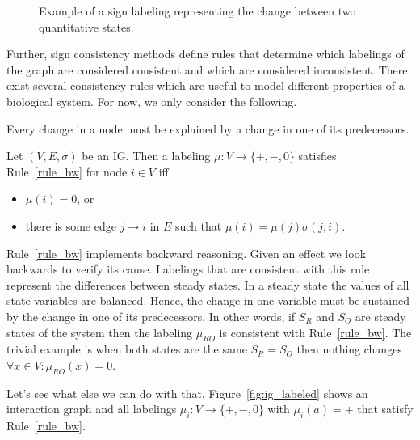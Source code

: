 \begin{figure}
  \caption{Example of a sign labeling representing the change between two quantitative states.
  }
  \label{fig:state_change}
\end{figure}

Further, sign consistency methods define rules that determine which labelings 
of the graph are considered consistent and which are considered inconsistent.
There exist several consistency rules which are useful to model different 
properties of a biological system. 
For now, we only consider the following.

\begin{srule}
\label{rule_bw}
{\upshape Every change in a node must be explained by a change in one of its predecessors.}

Let $(V, E, \sigma)$ be an IG.
Then a labeling $\mu : V \rightarrow \{\plus, \minus, 0\}$ satisfies Rule~\ref{rule_bw} for node $i \in V$ iff
\begin{itemize}
 \item $\mu(i) = 0$, or
 \item there is some edge $j \rightarrow i$ in $E$ 
       such that $\mu(i)=\mu(j)\sigma(j,i)$.
\end{itemize}

 
\end{srule}

Rule~\ref{rule_bw} implements backward reasoning.
Given an effect we look backwards to verify its cause.
Labelings that are consistent with this rule represent the differences between steady states.
In a steady state the values of all state variables are balanced. 
Hence, the change in one variable must be sustained by the change in one of its predecessors.
In other words,
 if $S_R$ and $S_O$ are steady states of the system
 then the labeling $\mu_{RO}$ is consistent with Rule~\ref{rule_bw}.
The trivial example is when both states are the same $S_R = S_O$ then nothing changes $\forall x \in V : \mu_{RO}(x) = 0$.

Let's see what else we can do with that. 
Figure~\ref{fig:ig_labeled} shows an interaction graph and all labelings $\mu_i : V \rightarrow \{\plus, \minus, 0\}$ with $\mu_i(a)=\plus$ 
that satisfy Rule~\ref{rule_bw}.

